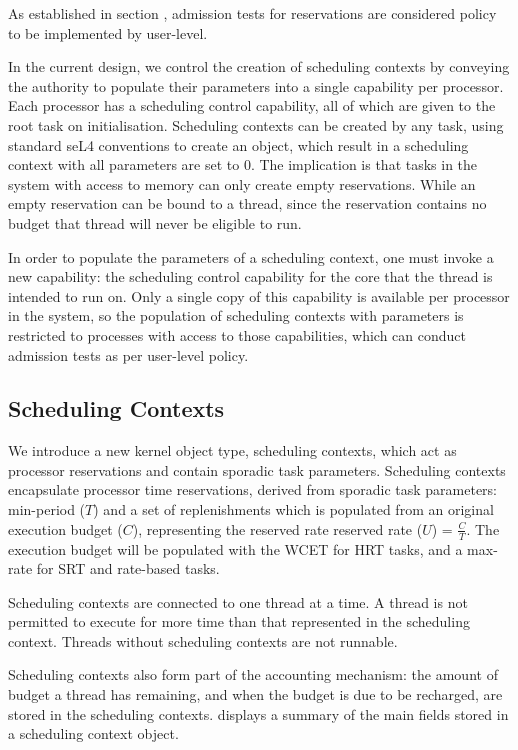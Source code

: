 As established in section , admission tests for reservations are considered policy to be implemented by user-level.

In the current design, we control the creation of scheduling contexts by conveying the authority to populate their parameters into a single capability per processor.
Each processor has a scheduling control capability, all of which are given to the root task on initialisation.
Scheduling contexts can be created by any task, using standard seL4 conventions to create an object, which result in a scheduling context with all parameters are set to 0.
The implication is that tasks in the system with access to memory can only create empty reservations.
While an empty reservation can be bound to a thread, since the reservation contains no budget that thread will never be eligible to run.

In order to populate the parameters of a scheduling context, one must invoke a new capability: the scheduling control capability for the core that the thread is intended to run on.
Only a single copy of this capability is available per processor in the system, so the population of scheduling contexts with parameters is restricted to processes with access to those capabilities, which can conduct admission tests as per user-level policy.

\subsection{Scheduling Contexts}
\label{sec:schedcontext}

We introduce a new kernel object type, scheduling contexts, which act as processor reservations and contain sporadic task parameters.
Scheduling contexts encapsulate processor time reservations, derived from sporadic task parameters: min-period ($T$) and a set of replenishments which is populated from an original execution budget ($C$), representing the reserved rate reserved rate ($U$) = $\frac{C}{T}$.
The execution budget will be populated with the \gls{WCET} for \gls{HRT} tasks, and a max-rate for \gls{SRT} and rate-based tasks.

Scheduling contexts are connected to one thread at a time.
A thread is not permitted to execute for more time than that represented in the scheduling context.
Threads without scheduling contexts are not runnable.

Scheduling contexts also form part of the accounting mechanism: the amount of budget a thread has remaining, and when the budget is due to be recharged, are stored in the scheduling contexts.
 displays a summary of the main fields stored in a scheduling context object.

